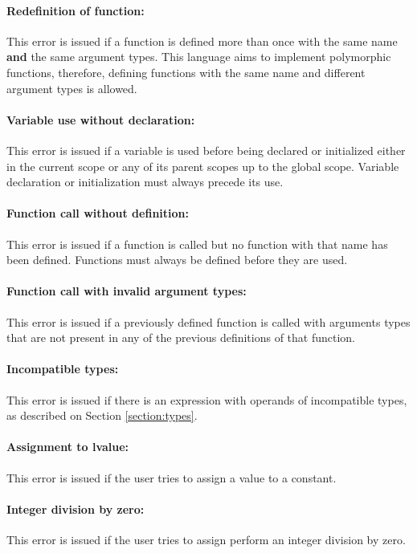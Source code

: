 \paragraph{Redefinition of function:} This error is issued if a function is
defined more than once with the same name \textbf{and} the same argument types.
This language aims to implement polymorphic functions, therefore, defining functions
with the same name and different argument types is allowed.

\paragraph{Variable use without declaration:} This error is issued if a variable is
used before being declared or initialized either in the current scope or any of its
parent scopes up to the global scope. Variable declaration or initialization must
always precede its use.

\paragraph{Function call without definition:} This error is issued if a function
is called but no function with that name has been defined. Functions must always
be defined before they are used.

\paragraph{Function call with invalid argument types:} This error is issued if a
previously defined function is called with arguments types that are not present
in any of the previous definitions of that function.

\paragraph{Incompatible types:} This error is issued if there is an expression
with operands of incompatible types, as described on Section \ref{section:types}.

\paragraph{Assignment to lvalue:} This error is issued if the user tries to assign
a value to a constant.

\paragraph{Integer division by zero:} This error is issued if the user tries to assign
perform an integer division by zero.

